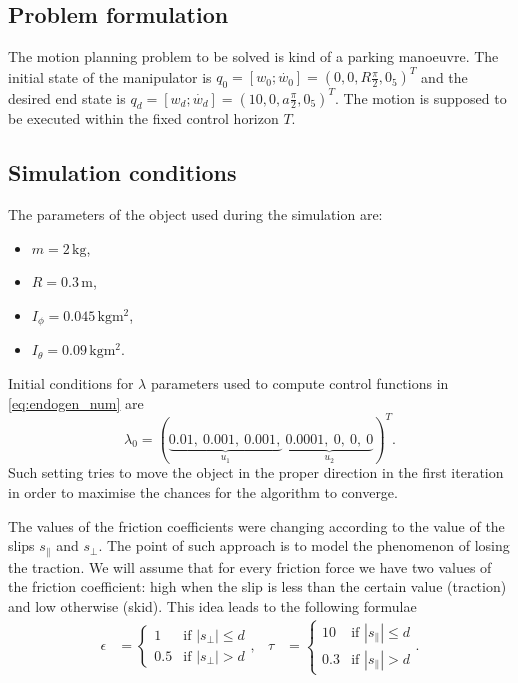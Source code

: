 \subsection{Problem formulation}
The motion planning problem to be solved is kind of a parking manoeuvre. The initial
state of the manipulator is $q_0 = [w_0; \dot{w_0}] = (0, 0, R\frac{\pi}{2}, 0_5)^T$
and the desired end state is $q_d = [w_d; \dot{w_d}] = (10, 0, a\frac{\pi}{2}, 0_5)^T$.
The motion is supposed to be executed within the fixed control horizon $T$.

\subsection{Simulation conditions}
\label{sec:discont_params_uni}
The parameters of the object used during the simulation are:
\begin{multicols}{2}
\begin{itemize}
\item $m=2 \,\mathrm{kg}$,
\item $R=0.3 \,\mathrm{m}$,
\item $I_\phi =0.045\,\mathrm{kgm^2}$,
\item $I_\theta =0.09\,\mathrm{kgm^2}$. 
\end{itemize}
\end{multicols}
Initial conditions for $\lambda$ parameters used to compute control functions
in \eqref{eq:endogen_num} are
\begin{equation}
\lambda_0=
(\underbrace{0.01, \ 0.001, \ 0.001,}_{u_1}\ \underbrace{0.0001, \ 0, \ 0, \ 0}_{u_2})^T.
\end{equation}
Such setting tries to move the object in the proper direction in the first iteration in order to
maximise the chances for the algorithm to converge.

The values of the friction coefficients were changing according to the value of the slips $s_\parallel$
and $s_\perp$. 
The point of such approach is to model the phenomenon
of losing the traction. We will assume that for every friction force we have two
values of the friction coefficient: high when the slip is less than the certain
value (traction) and low otherwise (skid). This idea leads to the following formulae
\begin{equation*}
\begin{aligned}
\epsilon&=\begin{cases}
1 &\mbox{if } |s_\perp| \leq d \\
0.5 &\mbox{if } |s_\perp| > d
\end{cases}, &
\tau&=\begin{cases}
10 &\mbox{if } |s_\parallel| \leq d \\
0.3 &\mbox{if } |s_\parallel| > d
\end{cases}.
\end{aligned}
\end{equation*}

